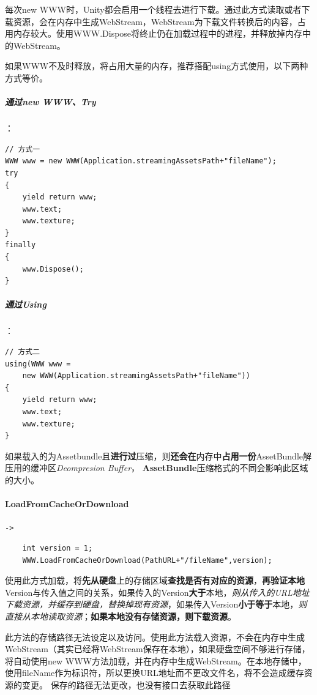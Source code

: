 \documentclass[UTF8,a4paper,12pt]{ctexbook}
\begin{document}
			每次new WWW时，Unity都会启用一个线程去进行下载。通过此方式读取或者下载资源，会在内存中生成WebStream，WebStream为下载文件转换后的内容，占用内存较大。使用WWW.Dispose将终止仍在加载过程中的进程，并释放掉内存中的WebStream。 
			
	        如果WWW不及时释放，将占用大量的内存，推荐搭配using方式使用，以下两种方式等价。
	        \subparagraph{通过new WWW、Try}：
				\begin{lstlisting}
// 方式一			
WWW www = new WWW(Application.streamingAssetsPath+"fileName"); 
try 
{ 
	yield return www; 
	www.text; 
	www.texture; 
} 
finally 
{ 
	www.Dispose(); 
} 
				\end{lstlisting}
			
			\subparagraph{通过Using}：	
				\begin{lstlisting}
// 方式二
using(WWW www = 
	new WWW(Application.streamingAssetsPath+"fileName")) 
{ 
	yield return www; 
	www.text; 
	www.texture; 
} 	
				\end{lstlisting}
			
			如果载入的为Assetbundle且\textbf{进行过}压缩，则\textbf{还会在}内存中\textbf{占用一份}AssetBundle解压用的缓冲区\textit{Deompresion Buffer}， \textbf{AssetBundle}压缩格式的不同会影响此区域的大小。
			
		\paragraph{LoadFromCacheOrDownload}\verb|->|
			
			\begin{lstlisting}
	int version = 1; 
	WWW.LoadFromCacheOrDownload(PathURL+"/fileName",version); 
			\end{lstlisting}
			
	       使用此方式加载，将\textbf{先从硬盘}上的存储区域\textbf{查找是否有对应的资源}，\textbf{再验证本地}Version与传入值之间的关系，如果传入的Version\textbf{大于}本地，\textit{则从传入的URL地址下载资源，并缓存到硬盘，替换掉现有资源}，如果传入Version\textbf{小于等于}本地，\textit{则直接从本地读取资源}；\textbf{如果本地没有存储资源，则下载资源}。
	       
	       \color{blue}此方法的存储路径无法设定以及访问。使用此方法载入资源，不会在内存中生成 WebStream（其实已经将WebStream保存在本地），如果硬盘空间不够进行存储，将自动使用new WWW方法加载，并在内存中生成WebStream。在本地存储中，使用fileName作为标识符，所以更换URL地址而不更改文件名，将不会造成缓存资源的变更。 	
		   保存的路径无法更改，也没有接口去获取此路径\color{black}
			
\end{document}

